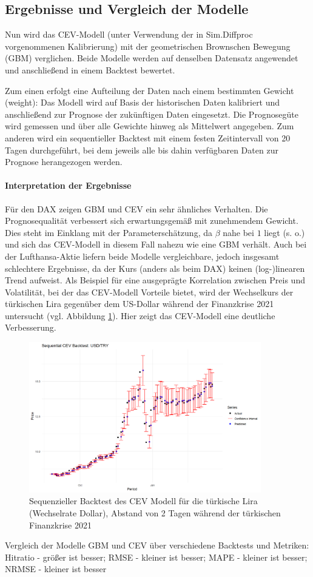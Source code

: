 \subsection{Ergebnisse und Vergleich der Modelle}

Nun wird das CEV-Modell (unter Verwendung der in Sim.Diffproc vorgenommenen Kalibrierung) mit der geometrischen Brownschen Bewegung (GBM) verglichen. Beide Modelle werden auf denselben Datensatz angewendet und anschließend in einem Backtest bewertet.

Zum einen erfolgt eine Aufteilung der Daten nach einem bestimmten Gewicht (weight): Das Modell wird auf Basis der historischen Daten kalibriert und anschließend zur Prognose der zukünftigen Daten eingesetzt. Die Prognosegüte wird gemessen und über alle Gewichte hinweg als Mittelwert angegeben.
Zum anderen wird ein sequentieller Backtest mit einem festen Zeitintervall von 20 Tagen durchgeführt, bei dem jeweils alle bis dahin verfügbaren Daten zur Prognose herangezogen werden.

\paragraph{Interpretation der Ergebnisse}
Für den DAX zeigen GBM und CEV ein sehr ähnliches Verhalten. Die Prognosequalität verbessert sich erwartungsgemäß mit zunehmendem Gewicht. Dies steht im Einklang mit der Parameterschätzung, da $\beta$ nahe bei $1$ liegt (s. o.) und sich das CEV-Modell in diesem Fall nahezu wie eine GBM verhält.
Auch bei der Lufthansa-Aktie liefern beide Modelle vergleichbare, jedoch insgesamt schlechtere Ergebnisse, da der Kurs (anders als beim DAX) keinen (log-)linearen Trend aufweist.
Als Beispiel für eine ausgeprägte Korrelation zwischen Preis und Volatilität, bei der das CEV-Modell Vorteile bietet, wird der Wechselkurs der türkischen Lira gegenüber dem US-Dollar während der Finanzkrise 2021 untersucht (vgl. Abbildung \ref{fig:cev_try}). Hier zeigt das CEV-Modell eine deutliche Verbesserung.

\begin{figure}[H]
    \centering
    \includegraphics[width=0.9\textwidth]{images/cev_try.png}
    \caption{Sequenzieller Backtest des CEV Modell für die türkische Lira (Wechselrate Dollar), Abstand von 2 Tagen während der türkischen Finanzkrise 2021}
    \label{fig:cev_try}
\end{figure}

\begin{table}
\centering
{}
\caption{Vergleich der Modelle GBM und CEV über verschiedene Backtests und Metriken: Hitratio - größer ist besser; RMSE - kleiner ist besser; MAPE - kleiner ist besser; NRMSE - kleiner ist besser}
\end{table}
